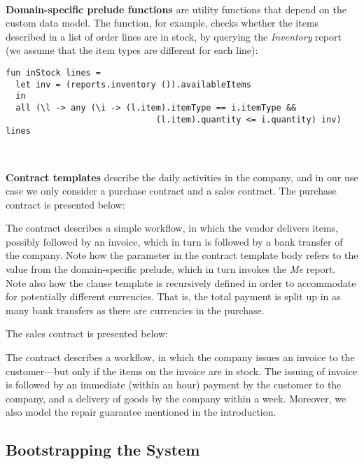 ~

\noindent\textbf{Domain-specific prelude functions} are utility
functions that depend on the custom data model. The 
function, for example, checks whether the items described in a list of
order lines are in stock, by querying the \emph{Inventory} report (we
assume that the item types are different for each line):
\begin{lstlisting}[language=pcsl,basicstyle=\small]
fun inStock lines =
  let inv = (reports.inventory ()).availableItems
  in
  all (\l -> any (\i -> (l.item).itemType == i.itemType &&
                              (l.item).quantity <= i.quantity) inv) lines
\end{lstlisting}

~

\noindent\textbf{Contract templates} describe the daily activities in
the company, and in our \muerp use case we only consider a purchase
contract and a sales contract. The purchase contract is presented
below:


The contract describes a simple workflow, in which the vendor delivers
items, possibly followed by an invoice, which in turn is followed by a
bank transfer of the company.  Note how the  parameter in the
contract template body refers to the value from the domain-specific
prelude, which in turn invokes the \emph{Me} report. Note also how the
 clause template is recursively defined in order to
accommodate for potentially different currencies. That is, the total
payment is split up in as many bank transfers as there are currencies
in the purchase.

The sales contract is presented below:


The contract describes a workflow, in which the company issues an
invoice to the customer---but only if the items on the invoice are in
stock. The issuing of invoice is followed by an immediate (within an
hour) payment by the customer to the company, and a delivery of goods
by the company within a week. Moreover, we also model the repair
guarantee mentioned in the introduction.

\subsection{Bootstrapping the System}
\label{sec:bootstrapping}

